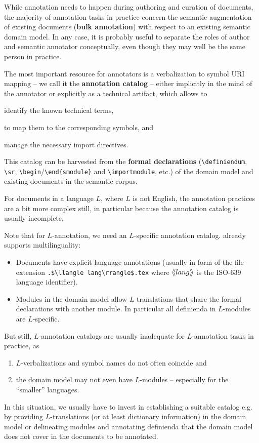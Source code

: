 \documentclass[runningheads]{llncs}
\def\llangle{\langle\kern-.2em\langle}
\def\rrangle{\rangle\kern-.2em\rangle}
\begin{document}
While annotation needs to happen during authoring and curation of documents, the majority
of annotation tasks in practice concern the semantic augmentation of existing documents
(\textbf{bulk annotation}) with respect to an existing semantic domain model. In any case,
it is probably useful to separate the roles of author and semantic annotator conceptually,
even though they may well be the same person in practice.

The most important resource for annotators is a verbalization to symbol URI mapping -- we
call it the \textbf{annotation catalog} -- either implicitly in the mind of the annotator
or explicitly as a technical artifact, which allows to
\begin{inparaenum}[\em i\rm)]
\item identify the known technical terms,
\item to map them to the corresponding symbols, and 
\item manage the necessary import directives.
\end{inparaenum}
This catalog can be harvested from the \textbf{formal declarations}
(\lstinline|\definiendum|, \lstinline|\sr|, \lstinline[language={}]|\begin|/\lstinline[language={}]|\end{smodule}| and
\lstinline|\importmodule|, etc.) of the domain model and existing documents in the
semantic corpus.

For documents in a language $L$,
where $L$ is not English, the annotation practices are a bit
more complex still, in particular because the annotation catalog is usually incomplete.

Note that for $L$-annotation, we need an $L$-specific annotation catalog. 
\sTeX already supports multilinguality:
\begin{itemize}
\item Documents have explicit language annotations (usually in form of the file extension
  \lstinline[mathescape]|.$\llangle lang\rrangle$.tex| where $\llangle lang\rrangle$ is the
  ISO-639 language identifier).
\item Modules in the domain model allow $L$-translations that share the formal
  declarations with another module. In particular all definienda in $L$-modules are
  $L$-specific.
\end{itemize}

But still, $L$-annotation catalogs are usually inadequate for $L$-annotation tasks in
practice, as
\begin{enumerate}[\em i\rm)]
\item $L$-verbalizations and symbol names do not often coincide and
\item the domain model may not even have $L$-modules -- especially for the ``smaller''
  languages.
\end{enumerate}
 In this situation, we usually have to invest in
establishing a suitable catalog e.g. by providing $L$-translations (or at least dictionary
information) in the domain model or delineating modules and annotating definienda that the
domain model does not cover in the documents to be annotated.
\end{document}
